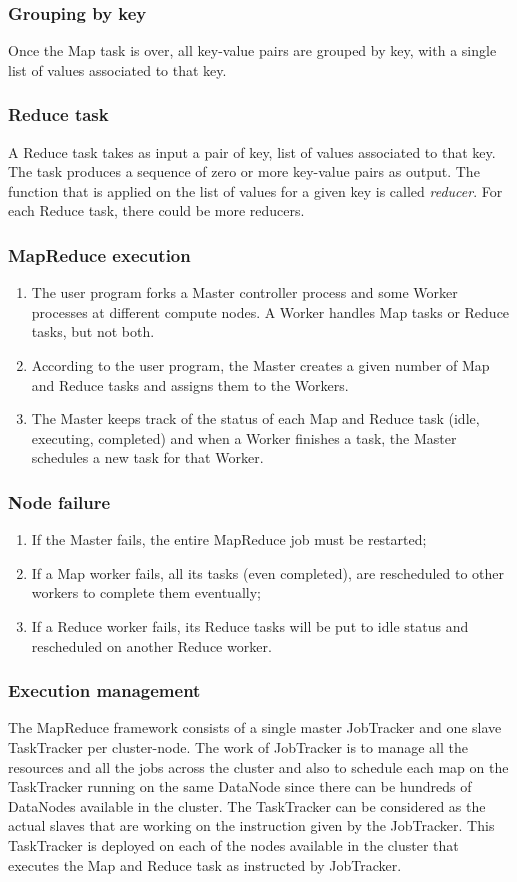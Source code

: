 \documentclass[\main/main.tex]{subfiles}
\begin{document}
\subsubsection{Grouping by key}
Once the Map task is over, all key-value pairs are grouped by key, with a single list of values associated to that key.
\subsubsection{Reduce task}
A Reduce task takes as input a pair of key, list of values associated to that key. The task produces a sequence of zero or more key-value pairs as output. The function that is applied on the list of values for a given key is called \emph{reducer}. For each Reduce task, there could be more reducers.
\subsubsection{MapReduce execution}
\begin{enumerate}
    \item The user program forks a Master controller process and some Worker processes at different compute nodes. A Worker handles Map tasks or Reduce tasks, but not both.
    \item According to the user program, the Master creates a given number of Map and Reduce tasks and assigns them to the Workers.
    \item The Master keeps track of the status of each Map and Reduce task (idle, executing, completed) and when a Worker finishes a task, the Master schedules a new task for that Worker.
\end{enumerate}
\subsubsection{Node failure}
\begin{enumerate}
    \item If the Master fails, the entire MapReduce job must be restarted;
    \item If a Map worker fails, all its tasks (even completed), are rescheduled to other workers to complete them eventually;
    \item If a Reduce worker fails, its Reduce tasks will be put to idle status and rescheduled on another Reduce worker.
\end{enumerate}
\subsubsection{Execution management}
The MapReduce framework consists of a single master JobTracker and one slave TaskTracker per cluster-node. The work of JobTracker is to manage all the resources and all the jobs across the cluster and also to schedule each map on the TaskTracker running on the same DataNode since there can be hundreds of DataNodes available in the cluster. The TaskTracker can be considered as the actual slaves that are working on the instruction given by the JobTracker. This TaskTracker is deployed on each of the nodes available in the cluster that executes the Map and Reduce task as instructed by JobTracker.
\end{document}
